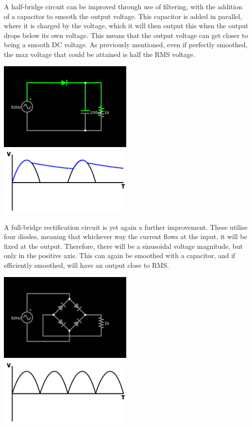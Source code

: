 \documentclass[a4paper,11pt]{report}
\begin{document}
\vspace*{1\baselineskip}

A half-bridge circuit can be improved through use of filtering, with the addition of a capacitor to smooth the output voltage. This capacitor is added in parallel, where it is charged by the voltage, which it will then output this when the output drops below its own voltage. This means that the output voltage can get closer to being a smooth DC voltage. As previously mentioned, even if perfectly smoothed, the max voltage that could be attained is half the RMS voltage.

\vspace*{1\baselineskip}

\includegraphics[width=0.5\textwidth]{halfbridgesmoothed}
\includegraphics[width=0.5\textwidth]{halfbridgewavesmoothed}

\vspace*{1\baselineskip}

A full-bridge rectification circuit is yet again a further improvement. These utilise four diodes, meaning that whichever way the current flows at the input, it will be fixed at the output. Therefore, there will be a sinusoidal voltage magnitude, but only in the positive axis. This can again be smoothed with a capacitor, and if efficiently smoothed, will have an output close to RMS.

\vspace*{1\baselineskip}

\includegraphics[width=0.5\textwidth]{fullbridge}
\includegraphics[width=0.5\textwidth]{fullbridgewave}
\end{document}
